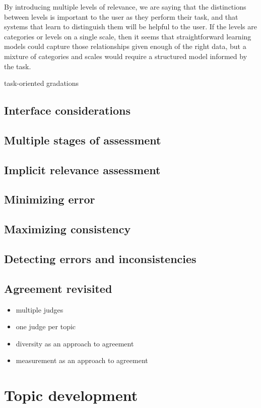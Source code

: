 \documentclass[nobib]{tufte-book}
\begin{document}
By introducing multiple levels of relevance, we are saying that the distinctions between levels is important to the user as they perform their task, and that systems that learn to distinguish them will be helpful to the user.  If the levels are categories or levels on a single scale, then it seems that straightforward learning models could capture those relationships given enough of the right data, but a mixture of categories and scales would require a structured model informed by the task.

task-oriented gradations

\section{Interface considerations}
\section{Multiple stages of assessment}
\section{Implicit relevance assessment}
\section{Minimizing error}
\section{Maximizing consistency}
\section{Detecting errors and inconsistencies}
\section{Agreement revisited}
\begin{itemize}
\item multiple judges
\item one judge per topic
\item diversity as an approach to agreement
\item measurement as an approach to agreement
\end{itemize}

\chapter{Topic development} \label{topic-development}
\end{document}
